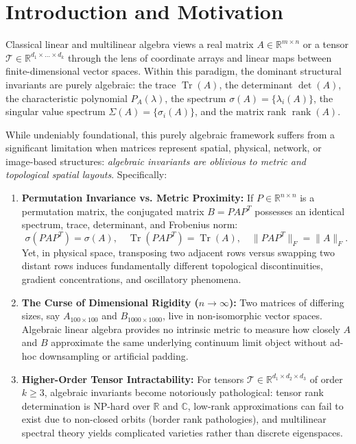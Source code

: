 \documentclass[11pt,a4paper,reqno]{amsart}
\theoremstyle{definition}
\numberwithin{equation}{section}
\providecommand{\R}{\mathbb{R}}
\newcommand{\C}{\mathbb{C}}
\newcommand{\Tr}{\operatorname{Tr}}
\newcommand{\rank}{\operatorname{rank}}
\providecommand{\R}{\mathbb{R}}
\begin{document}
\maketitle

\tableofcontents

\newpage

\section{Introduction and Motivation}
\label{sec:intro}

Classical linear and multilinear algebra views a real matrix $A \in \R^{m \times n}$ or a tensor $\mathcal{T} \in \R^{d_1 \times \dots \times d_k}$ through the lens of coordinate arrays and linear maps between finite-dimensional vector spaces. Within this paradigm, the dominant structural invariants are purely algebraic: the trace $\Tr(A)$, the determinant $\det(A)$, the characteristic polynomial $P_A(\lambda)$, the spectrum $\sigma(A) = \{\lambda_i(A)\}$, the singular value spectrum $\Sigma(A) = \{\sigma_i(A)\}$, and the matrix rank $\rank(A)$.

While undeniably foundational, this purely algebraic framework suffers from a significant limitation when matrices represent spatial, physical, network, or image-based structures: \emph{algebraic invariants are oblivious to metric and topological spatial layouts}. Specifically:
\begin{enumerate}[label=(\alph*)]
    \item \textbf{Permutation Invariance vs. Metric Proximity:} If $P \in \R^{n \times n}$ is a permutation matrix, the conjugated matrix $B = P A P^T$ possesses an identical spectrum, trace, determinant, and Frobenius norm:
    \begin{equation}
        \sigma(P A P^T) = \sigma(A), \quad \Tr(P A P^T) = \Tr(A), \quad \|P A P^T\|_F = \|A\|_F.
    \end{equation}
    Yet, in physical space, transposing two adjacent rows versus swapping two distant rows induces fundamentally different topological discontinuities, gradient concentrations, and oscillatory phenomena.
    \item \textbf{The Curse of Dimensional Rigidity ($n \to \infty$):} Two matrices of differing sizes, say $A_{100 \times 100}$ and $B_{1000 \times 1000}$, live in non-isomorphic vector spaces. Algebraic linear algebra provides no intrinsic metric to measure how closely $A$ and $B$ approximate the same underlying continuum limit object without ad-hoc downsampling or artificial padding.
    \item \textbf{Higher-Order Tensor Intractability:} For tensors $\mathcal{T} \in \R^{d_1 \times d_2 \times d_3}$ of order $k \ge 3$, algebraic invariants become notoriously pathological: tensor rank determination is NP-hard over $\R$ and $\C$, low-rank approximations can fail to exist due to non-closed orbits (border rank pathologies), and multilinear spectral theory yields complicated varieties rather than discrete eigenspaces.
\end{enumerate}
\end{document}
